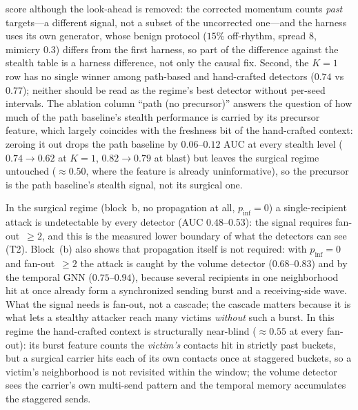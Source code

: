 score although the look-ahead is removed: the corrected momentum counts \emph{past} targets---a different
signal, not a subset of the uncorrected one---and the harness uses its own generator, whose benign
protocol ($15\%$ off-rhythm, spread $8$, mimicry $0.3$) differs from the first harness, so part of the
difference against the stealth table is a harness difference, not only the causal fix. Second, the $K{=}1$ row has no
single winner among path-based and hand-crafted detectors ($0.74$ vs $0.77$); neither should be read as
the regime's best detector without per-seed intervals. The ablation column ``path (no precursor)''
answers the question of how much of the path baseline's stealth performance is carried by its precursor
feature, which largely coincides with the freshness bit of the hand-crafted context: zeroing it out
drops the path baseline by $0.06$--$0.12$ AUC at every stealth level ($0.74\!\to\!0.62$ at $K{=}1$,
$0.82\!\to\!0.79$ at blast) but leaves the surgical regime untouched ($\approx\!0.50$, where the feature is
already uninformative), so the precursor is the path baseline's stealth signal, not its surgical one.

In the surgical regime (block~b, no propagation at all, $p_\mathrm{inf}{=}0$) a single-recipient
attack is undetectable by every detector (AUC $0.48$--$0.53$): the signal requires fan-out~$\ge2$, and this is
the measured lower boundary of what the detectors can see (T2). Block~(b) also shows that propagation itself
is not required: with $p_\mathrm{inf}{=}0$ and fan-out~$\ge2$ the attack is caught by the volume detector
($0.68$--$0.83$) and by the temporal GNN ($0.75$--$0.94$), because several recipients in one neighborhood hit
at once already form a synchronized sending burst and a receiving-side wave. What the signal needs is
fan-out, not a cascade; the cascade matters because it is what lets a stealthy attacker reach many victims
\emph{without} such a burst. In this regime the hand-crafted context is structurally near-blind
($\approx\!0.55$ at every fan-out): its burst feature counts the \emph{victim's} contacts hit in strictly
past buckets, but a surgical carrier hits each of its own contacts once at staggered buckets, so a victim's
neighborhood is not revisited within the window; the volume detector sees the carrier's own multi-send
pattern and the temporal memory accumulates the staggered sends.

